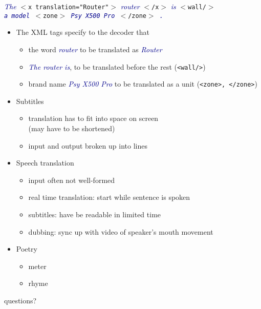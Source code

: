 \documentclass[landscape]{jhuslides3C}
\newcommand{\example}[1]{\textcolor{darkblue}{\em #1}}
\begin{document}
\vfill
\begin{center}\noindent
 \example{\em The} {\tt $<$x translation="Router"$>$}  \example{\em router} {\tt $<$/x$>$}  \example{\em is}  \tt{$<$wall/$>$}\\[3mm] 
  \example{\em a model} {\tt $<$zone$>$} \example{\em Psy X500 Pro} {\tt $<$/zone$>$}  \example{\em .}
\end{center}
\vfill
\begin{itemize}
\item The XML tags specify to the decoder that
\begin{itemize}\itemsep 3mm
\item the word \example{\em router} to be translated as \example{\em Router}
\item \example{\em The router is}, to be translated before the rest ({\tt <wall/>})
\item brand name \example{\em Psy X500 Pro} to be translated as a unit ({\tt <zone>, </zone>})
\end{itemize}
\end{itemize}
\vfill


\vfill
\begin{itemize}
\item Subtitles
\begin{itemize}
\item translation has to fit into space on screen\\ (may have to be shortened) 
\item input and output broken up into lines\pause
\end{itemize}
\item Speech translation
\begin{itemize}
\item input often not well-formed 
\item real time translation: start while sentence is spoken
\item subtitles: have be readable in limited time
\item dubbing: sync up with video of speaker's mouth movement\pause
\end{itemize}
\item Poetry
\begin{itemize}
\item meter
\item rhyme
\end{itemize}
\end{itemize}
\vfill


\slide{}
\vfill
\begin{center}
{\huge questions?}
\end{center}
\vfill
\end{document}

